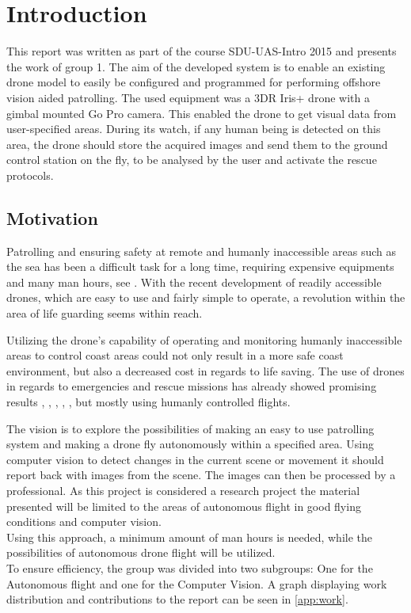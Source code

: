 \chapter*{Introduction}
This report was written as part of the course SDU-UAS-Intro 2015 and presents the work of group 1. 
The aim of the developed system is to enable an existing drone model to easily be configured and
programmed for performing offshore vision aided patrolling. 
The used equipment was a 3DR Iris+ drone with a gimbal mounted Go Pro camera.
This enabled the drone to get visual data from %
user-specified areas. %
During its watch, if any human being is detected on this area, the drone should store the acquired images and send
them to the ground control station on the fly, to be analysed by the user and activate the rescue protocols.

\section*{Motivation}
Patrolling and ensuring safety at remote and humanly inaccessible areas such as the sea has 
been a difficult task for a long time, requiring expensive equipments and many man hours,
see \cite{Ref:Drone2}.
With the recent development of readily accessible drones, which are easy to use and fairly simple to operate,
a revolution within the area of life guarding seems within reach. 

Utilizing the drone's capability of operating and monitoring humanly inaccessible areas to control coast areas
could not only result in a more safe coast environment, but also a decreased cost in regards to life saving.
The use of drones in regards to emergencies and rescue missions has already showed promising results
\cite{Ref:Drone1}, \cite{Ref:Drone3}, \cite{Ref:Drone4}, \cite{Ref:DroneResearch1}, \cite{Ref:DroneResearch1},
but mostly using humanly controlled flights.

The vision is to explore the possibilities of making an easy to use patrolling system
and making a drone fly autonomously within a specified area.
Using computer vision to detect changes in the current scene or movement it should report back with images from the scene.
The images can then be processed by a professional. As this project is considered a research project the material presented
will be limited to the areas of autonomous flight in good flying conditions and computer vision.
\\ 
Using this approach, a minimum amount of man hours is needed, while the possibilities of autonomous drone flight will be utilized.
\\
To ensure efficiency, the group was divided into two subgroups: One for the Autonomous flight and one for the Computer Vision.
A graph displaying work distribution and contributions to the report can be seen in \ref{app:work}.

